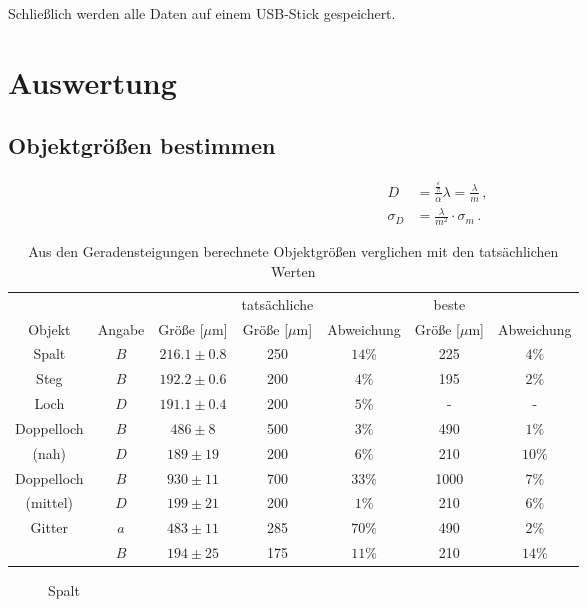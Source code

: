 \documentclass[12pt,a4paper,titlepage,headinclude,bibtotoc]{scrartcl}
\begin{document}
Schließlich werden alle Daten auf einem USB-Stick gespeichert.

\section{Auswertung}
\label{sec:auswertung}
\subsection{Objektgrößen bestimmen}

\begin{align}
	D&=\frac{\frac{\varepsilon}{\pi}}{\alpha}\lambda=\frac{\lambda}{m}\,,
	\label{eq:objekt}\\
	\sigma_D&=\frac{\lambda}{m^2}\cdot \sigma_m\,.
\end{align}

\begin{table}[!htb]
	\centering
	\begin{tabular}{|c|c||c||c|c||c|c|}
		\hline
		 & & & tatsächliche &  & beste &  \\
		Objekt & Angabe & Größe [$\mu$m] & Größe [$\mu$m] & Abweichung & Größe [$\mu$m] & Abweichung \\
		\hline
		\hline
		Spalt & $B$ & $216.1 \pm 0.8$ & 250 & $14\%$ & 225 & $4\%$ \\
		Steg & $B$ & $192.2 \pm 0.6$ & 200 & $4\%$ & 195 & $2\%$ \\
		Loch & $D$ & $191.1 \pm 0.4$ & 200 & $5\%$ & - & - \\
		\hline
		Doppelloch & $B$ & $486 \pm 8$ & 500 & $3\%$ & 490 & $1\%$ \\
		(nah) & $D$ & $189 \pm 19$ & 200 & $6\%$ & 210 & $10\%$ \\
		\hline
		Doppelloch & $B$& $930 \pm 11$ & 700 & $33\%$ & 1000 & $7\%$ \\
		(mittel) & $D$& $199 \pm 21$ & 200 & $1\%$ & 210 & $6\%$ \\
		\hline		
		Gitter & $a$ & $483  \pm 11$ & 285 & $70\%$ & 490 & $2\%$ \\
		& $B$ & $194 \pm 25$ & 175 & $11\%$ & 210 & $14\%$ \\
		\hline
	\end{tabular}
	\caption{Aus den Geradensteigungen berechnete Objektgrößen verglichen mit den tatsächlichen Werten}
	\label{tab:objektgroeßen}
\end{table}

\begin{figure}[!htb]
	\centering
	
	\caption{Spalt}
	\label{fig:spalt_reg}
\end{figure}
\end{document}
